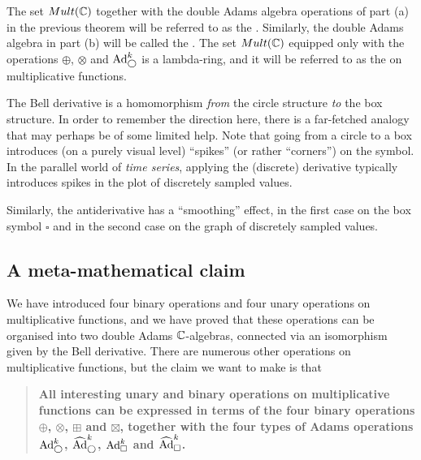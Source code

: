 \begin{definition}
The set $Mult(\mathbb{C})$ together with the double Adams algebra operations of part (a) in the previous theorem will be referred to as the . Similarly, the double Adams algebra in part (b) will be called the . The set $Mult(\mathbb{C})$ equipped only with the operations $\oplus$, $\otimes$ and $\text{Ad}^{k}_{\bigcirc}$ is a lambda-ring, and it will be referred to as the  on multiplicative functions.
 \end{definition}


\begin{remark}
The Bell derivative is a homomorphism \emph{from} the circle structure \emph{to} the box structure. In order to remember the direction here, there is a far-fetched analogy that may perhaps be of some limited help. Note that going from a circle to a box introduces (on a purely visual level) ``spikes'' (or rather ``corners'') on the symbol. In the parallel world of \emph{time series}, applying the (discrete) derivative typically introduces spikes in the plot of discretely sampled values. 

Similarly, the antiderivative has a ``smoothing'' effect, in the first case on the box symbol $\square$ and in the second case on the graph of discretely sampled values. 


\end{remark}



\subsection{A meta-mathematical claim}

We have introduced four binary operations and four unary operations on multiplicative functions, and we have proved that these operations can be organised into two double Adams $\mathbb{C}$-algebras, connected via an isomorphism given by the Bell derivative. There are numerous other operations on multiplicative functions, but the claim we want to make is that
\begin{quote}
\textbf{All interesting unary and binary operations on multiplicative functions can be expressed in terms of the four binary operations $\oplus$, $\otimes$, $\boxplus$ and $\boxtimes$, together with the four types of Adams operations $\text{Ad}^{k}_{\bigcirc}$, $\widehat{\text{Ad}}^{k}_{\bigcirc}$, $\text{Ad}^{k}_{\square}$ and $\widehat{\text{Ad}}^{k}_{\square}$.}
\end{quote}


